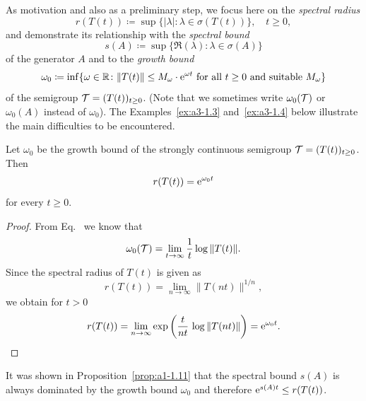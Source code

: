 As motivation and also as a preliminary step, we focus here on the \emph{spectral radius}
\begin{equation}\label{eq:a3-1.1}
	r(T(t)) \coloneq  \sup \{ |\lambda| \colon \lambda \in \sigma(T(t)) \}, \quad t \geq 0 ,
\end{equation}
and demonstrate its relationship with the \emph{spectral bound}
\begin{equation}\label{eq:a3-1.2}
	s(A) \coloneq  \sup \{ \Re(\lambda) \colon \lambda \in \sigma(A) \}
\end{equation}
of the generator $A$ and to the \emph{growth bound}
\begin{equation}\label{eq:a3-1.3}
	\omega_{0} \coloneq  \inf \{\omega \in \R  \colon \|T(t)\| \leq M_{\omega}\cdot \eu^{\omega t} \text{ for all } t \geq 0 \text{ and suitable } M_{\omega}\}
\end{equation}
of the semigroup $\TT = (T(t))_{t\geq 0}$.
(Note that we sometimes write $\omega_{0}(\mathcal{T})$ or $\omega_{0}(A)$ instead of\/ $\omega_{0}$).
%
The Examples~\ref{ex:a3-1.3} and~\ref{ex:a3-1.4} below illustrate the main difficulties to be encountered.
\begin{proposition}\label{prop:a3-1.1}
Let $\omega_{0}$ be the growth bound of the strongly continuous semigroup $\TT = (T(t))_{t\geq 0}$.
Then
\begin{equation}\label{eq:a3-1.4}
	r(T(t)) = \mathrm{e}^{\omega_{0} t}
\end{equation}
for every $t \geq 0$.
\end{proposition}
\begin{proof}
From Eq.~ we know that
\[
    \omega_{0}(\mathcal{T}) = \lim_{t \to \infty} \frac{1}{t} \log \|T(t)\| .
\]
Since the spectral radius of\/ $T(t)$ is given as
\[
    r(T(t)) = \lim_{n \to \infty} \|T(nt)\|^{1/n} ,
\]
we obtain for $t > 0$
\begin{equation*}
    r(T(t)) = \lim_{n \to \infty} \exp\left( \frac{t}{nt}\,\log \|T(nt)\|\right) = \mathrm{e}^{\omega_{0} t} .
    \qedhere
\end{equation*}
\end{proof}
It was shown in Proposition~\ref{prop:a1-1.11} that the spectral bound $s(A)$ is always dominated by the growth bound $\omega_{0}$ and therefore $\eu^{s(A)t} \leq r(T(t))$.
